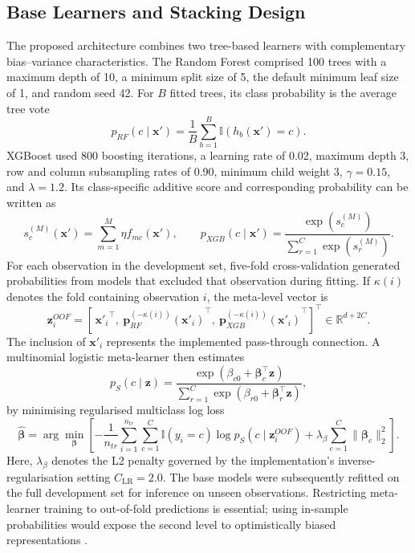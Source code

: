 \documentclass{elektr}
\begin{document}
\subsection{Base Learners and Stacking Design}
The proposed architecture combines two tree-based learners with complementary bias--variance characteristics. The Random Forest comprised 100 trees with a maximum depth of 10, a minimum split size of 5, the default minimum leaf size of 1, and random seed 42. For $B$ fitted trees, its class probability is the average tree vote
\begin{equation}
p_{RF}(c\mid\mathbf{x}')=\frac{1}{B}\sum_{b=1}^{B}
\mathbb{I}\!\left(h_b(\mathbf{x}')=c\right).
\label{eq:rf}
\end{equation}
XGBoost used 800 boosting iterations, a learning rate of 0.02, maximum depth 3, row and column subsampling rates of 0.90, minimum child weight 3, $\gamma=0.15$, and $\lambda=1.2$. Its class-specific additive score and corresponding probability can be written as
\begin{equation}
s_c^{(M)}(\mathbf{x}')=\sum_{m=1}^{M}\eta f_{mc}(\mathbf{x}'),
\qquad
p_{XGB}(c\mid\mathbf{x}')=
\frac{\exp(s_c^{(M)})}{\sum_{r=1}^{C}\exp(s_r^{(M)})}.
\label{eq:xgb}
\end{equation}
For each observation in the development set, five-fold cross-validation generated probabilities from models that excluded that observation during fitting. If $\kappa(i)$ denotes the fold containing observation $i$, the meta-level vector is
\begin{equation}
\mathbf{z}^{OOF}_i=\left[\,{\mathbf{x}'_i}^{\!\top},\
{\mathbf{p}_{RF}^{(-\kappa(i))}(\mathbf{x}'_i)}^{\!\top},\
{\mathbf{p}_{XGB}^{(-\kappa(i))}(\mathbf{x}'_i)}^{\!\top}\right]^{\!\top}
\in\mathbb{R}^{d+2C}.
\label{eq:oofvector}
\end{equation}
The inclusion of $\mathbf{x}'_i$ represents the implemented pass-through connection. A multinomial logistic meta-learner then estimates
\begin{equation}
p_{S}(c\mid\mathbf{z})=
\frac{\exp(\beta_{c0}+\boldsymbol{\beta}_c^{\top}\mathbf{z})}
{\sum_{r=1}^{C}\exp(\beta_{r0}+\boldsymbol{\beta}_r^{\top}\mathbf{z})},
\label{eq:meta}
\end{equation}
by minimising regularised multiclass log loss
\begin{equation}
\widehat{\boldsymbol{\beta}}=
\arg\min_{\boldsymbol{\beta}}
\left[-\frac{1}{n_{tr}}\sum_{i=1}^{n_{tr}}\sum_{c=1}^{C}
\mathbb{I}(y_i=c)\log p_S(c\mid\mathbf{z}^{OOF}_i)
+\lambda_{\beta}\sum_{c=1}^{C}\lVert\boldsymbol{\beta}_c\rVert_2^2\right].
\label{eq:metaloss}
\end{equation}
Here, $\lambda_{\beta}$ denotes the L2 penalty governed by the implementation's inverse-regularisation setting $C_{\mathrm{LR}}=2.0$. The base models were subsequently refitted on the full development set for inference on unseen observations. Restricting meta-learner training to out-of-fold predictions is essential; using in-sample probabilities would expose the second level to optimistically biased representations \cite{kapoor2023,alabi2023}.
\end{document}
